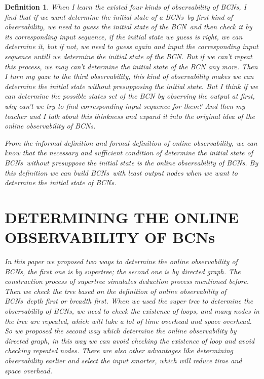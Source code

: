 \documentclass[conference]{IEEEtran} %
\newtheorem{definition}{Definition}
\def \BCN {{\em BCN}}
\def \BCNs {{\em BCNs}}
\begin{document}
\begin{definition}
When I learn the existed four kinds of observability of {\em BCNs}, I find that if we want determine the initial state of a \BCNs\ by first kind of observability, we need to guess the initial state of the \BCN\ and then check it by its corresponding input sequence, if the initial state we guess is right, we can determine it, but if not, we need to guess again and input the corresponding input sequence untill we determine the initial state of the {\em BCN}. But if we can't repeat this process, we may can't determine the initial state of the {\em BCN} any more. Then I turn my gaze to the third observability, this kind of observability makes we can determine the initial state without presupposing the initial state. But I think if we can determine the possible states set of the {\em BCN} by observing the output at first, why can't we try to find corresponding input sequence for them? And then my teacher and I talk about this thinkness and expand it into the original idea of the online observability of {\em BCNs}. 

From the informal definition and formal definition of online observability, we can know that the necessary and sufficient condition of determine the initial state of \BCNs\ without presuppose the initial state is the online observability of {\em BCNs}. By this definition we can build \BCNs\ with least output nodes when we want to determine the initial state of {\em BCNs}.
\section{DETERMINING THE ONLINE OBSERVABILITY OF BCNs}

In this paper we proposed two ways to determine the online observability of {\em BCNs}, the first one is by supertree; the second one is by directed graph. The construction process of supertree simulates deduction process mentioned before. Then we check the tree based on the definition of online observability of \BCNs\ depth first or breadth first. When we used the super tree to determine the observability of {\em BCNs}, we need to check the existence of loops, and many nodes in the tree are repeated, which will take a lot of time overhead and space overhead. So we proposed the second way which determine the online observability by directed graph,   in this way we can avoid checking the existence of loop and avoid checking repeated nodes. There are also other advantages like determining observability earlier and select the input smarter, which will reduce time and space overhead.    


\end{definition}
\end{document}
